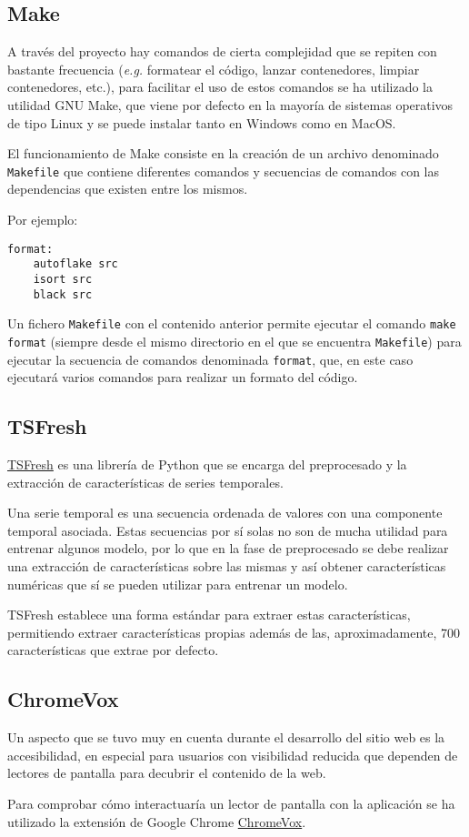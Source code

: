 \subsection{Make}

A través del proyecto hay comandos de cierta complejidad que se repiten con
bastante frecuencia (\textit{e.g.} formatear el código, lanzar contenedores,
limpiar contenedores, etc.), para facilitar el uso de estos comandos se ha
utilizado la utilidad GNU Make, que viene por defecto en la mayoría de sistemas
operativos de tipo Linux y se puede instalar tanto en Windows como en MacOS.

El funcionamiento de Make consiste en la creación de un archivo denominado
\texttt{Makefile} que contiene diferentes comandos y secuencias de comandos con
las dependencias que existen entre los mismos.

Por ejemplo:

\begin{verbatim}
format:
    autoflake src
    isort src
    black src
\end{verbatim}

Un fichero \texttt{Makefile} con el contenido anterior permite ejecutar el
comando \texttt{make format} (siempre desde el mismo directorio en el que se
encuentra \texttt{Makefile}) para ejecutar la secuencia de comandos denominada
\texttt{format}, que, en este caso ejecutará varios comandos para realizar un
formato del código.

\subsection{TSFresh}

\href{https://github.com/blue-yonder/tsfresh}{TSFresh} \cite{christ2018time} es
una librería de Python que se encarga del preprocesado y la extracción de
características de series temporales.

Una serie temporal es una secuencia ordenada de valores con una componente
temporal asociada. Estas secuencias por sí solas no son de mucha utilidad para
entrenar algunos modelo, por lo que en la fase de preprocesado se debe realizar
una extracción de características sobre las mismas y así obtener características
numéricas que sí se pueden utilizar para entrenar un modelo.

TSFresh establece una forma estándar para extraer estas características,
permitiendo extraer características propias además de las, aproximadamente, 700
características que extrae por defecto.

\subsection{ChromeVox}

Un aspecto que se tuvo muy en cuenta durante el desarrollo del sitio web es la
accesibilidad, en especial para usuarios con visibilidad reducida que dependen
de lectores de pantalla para decubrir el contenido de la web.

Para comprobar cómo interactuaría un lector de pantalla con la aplicación se ha
utilizado la extensión de Google Chrome
\href{https://chrome.google.com/webstore/detail/screen-reader/kgejglhpjiefppelpmljglcjbhoiplfn}{ChromeVox}.
